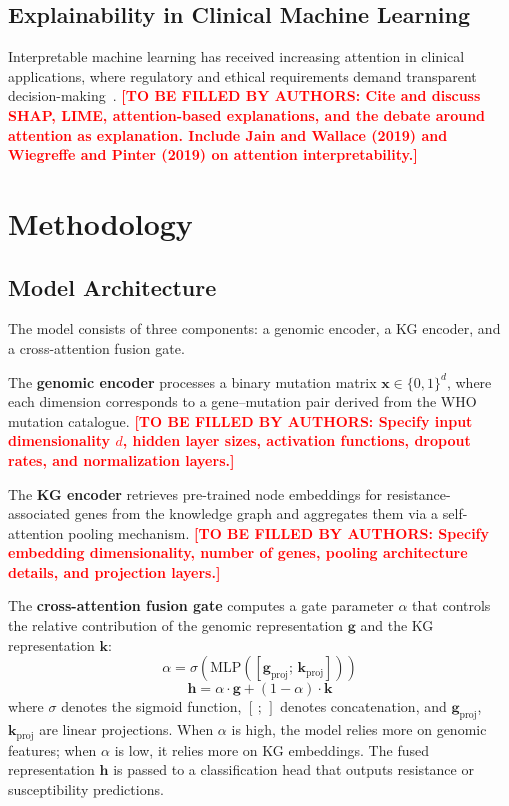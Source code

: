 \documentclass[conference]{IEEEtran}
\newcommand{\tbd}[1]{\textcolor{red}{\textbf{[TO BE FILLED BY AUTHORS: #1]}}}
\begin{document}
\subsection{Explainability in Clinical Machine Learning}

Interpretable machine learning has received increasing attention in clinical applications, where regulatory and ethical requirements demand transparent decision-making~\cite{ref_xai_clinical}. \tbd{Cite and discuss SHAP, LIME, attention-based explanations, and the debate around attention as explanation. Include Jain and Wallace (2019) and Wiegreffe and Pinter (2019) on attention interpretability.}

\section{Methodology}

\subsection{Model Architecture}

The model consists of three components: a genomic encoder, a KG encoder, and a cross-attention fusion gate.

The \textbf{genomic encoder} processes a binary mutation matrix $\mathbf{x} \in \{0,1\}^{d}$, where each dimension corresponds to a gene--mutation pair derived from the WHO mutation catalogue. \tbd{Specify input dimensionality $d$, hidden layer sizes, activation functions, dropout rates, and normalization layers.}

The \textbf{KG encoder} retrieves pre-trained node embeddings for resistance-associated genes from the knowledge graph and aggregates them via a self-attention pooling mechanism. \tbd{Specify embedding dimensionality, number of genes, pooling architecture details, and projection layers.}

The \textbf{cross-attention fusion gate} computes a gate parameter $\alpha$ that controls the relative contribution of the genomic representation $\mathbf{g}$ and the KG representation $\mathbf{k}$:
\begin{equation}
    \alpha = \sigma\!\left(\mathrm{MLP}\!\left([\mathbf{g}_{\mathrm{proj}};\, \mathbf{k}_{\mathrm{proj}}]\right)\right)
\end{equation}
\begin{equation}
    \mathbf{h} = \alpha \cdot \mathbf{g} + (1 - \alpha) \cdot \mathbf{k}
\end{equation}
where $\sigma$ denotes the sigmoid function, $[\,;\,]$ denotes concatenation, and $\mathbf{g}_{\mathrm{proj}}$, $\mathbf{k}_{\mathrm{proj}}$ are linear projections. When $\alpha$ is high, the model relies more on genomic features; when $\alpha$ is low, it relies more on KG embeddings. The fused representation $\mathbf{h}$ is passed to a classification head that outputs resistance or susceptibility predictions.
\end{document}
